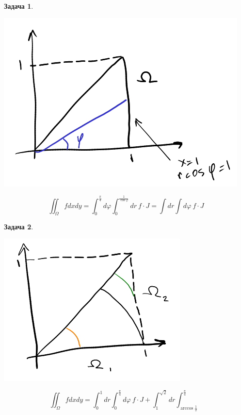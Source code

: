 \documentclass[english]{article}
\theoremstyle{plain}
\theoremstyle{remark}
\theoremstyle{definition}
\newtheorem{task}{Задача}
\begin{document}
\begin{task}
\-
\begin{center}
\includegraphics[scale=0.3]{3_3.png}
\end{center}
\[ \iint_\Omega f dx dy = \int^{\frac{\pi}{4}}_0 d\varphi \int_0^{\frac{1}{\cos\varphi}} dr\ f\cdot J = \int dr \int d\varphi\ f\cdot J \]
\end{task}
\begin{task}
\-
\begin{center}
\includegraphics[scale=0.3]{3_4.png}
\end{center}
\[ \iint_\Omega f dx dy = \int^1_0 dr \int^{\frac{\pi}{4}}_0 d\varphi\ f\cdot J + \int_1^{\sqrt{2}}dr\int^{\frac{\pi}{4}}_{\arccos \frac{1}{2}}\]
\end{task}
\end{document}
